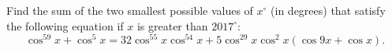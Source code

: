 Find the sum of the two smallest possible values of $x^\circ$ (in degrees) that satisfy the following equation if $x$ is greater than $2017^\circ$: $$\cos^59x+\cos^5x=32\cos^55x\cos^54x+5\cos^29x\cos^2x\left(\cos9x+\cos x\right).$$